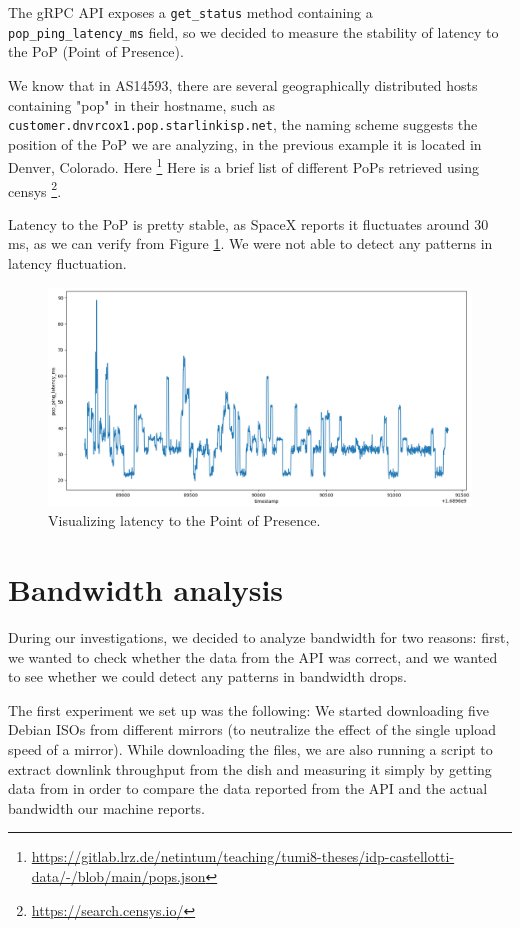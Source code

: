 \documentclass[IN,11pt,twoside,openright,idp,english]{tumthesis}
\begin{document}
The gRPC API exposes a \texttt{get\_status} method containing a \texttt{pop\_ping\_latency\_ms} field, so we decided to measure the stability of latency to the PoP (Point of Presence). 

We know that in AS14593, there are several geographically distributed hosts containing "pop" in their hostname, such as \texttt{customer.dnvrcox1.pop.starlinkisp.net}, the naming scheme suggests the position of the PoP we are analyzing, in the previous example it is located in Denver, Colorado. Here \footnote{\url{https://gitlab.lrz.de/netintum/teaching/tumi8-theses/idp-castellotti-data/-/blob/main/pops.json}}
Here is a brief list of different PoPs retrieved using censys \footnote{\url{https://search.censys.io/}}.

Latency to the PoP is pretty stable, as SpaceX reports it fluctuates around 30 ms, as we can verify from Figure \ref{fig:vis-latency}. We were not able to detect any patterns in latency fluctuation.

\begin{figure}
    \centering
    \includegraphics[width=1\columnwidth]{img/latency.png}
    \caption{Visualizing latency to the Point of Presence.}
    \label{fig:vis-latency}
\end{figure}

\section{Bandwidth analysis}

During our investigations, we decided to analyze bandwidth for two reasons: first, we wanted to check whether the data from the API was correct, and we wanted to see whether we could detect any patterns in bandwidth drops.

The first experiment we set up was the following: We started downloading five Debian ISOs from different mirrors (to neutralize the effect of the single upload speed of a mirror). While downloading the files, we are also running a script to extract downlink throughput from the dish and measuring it simply by getting data from  in order to compare the data reported from the API and the actual bandwidth our machine reports.
\end{document}
